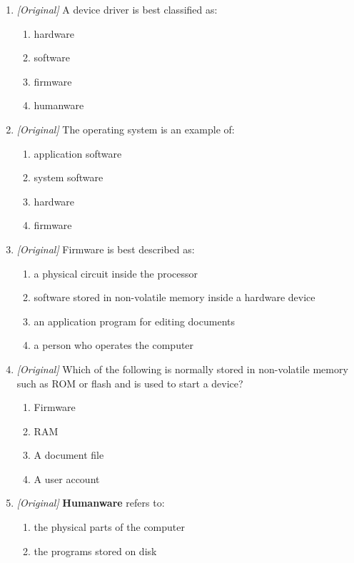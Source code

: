 \documentclass[11pt]{article}
\begin{document}
\begin{enumerate}[label=\textbf{Q\arabic*.}, leftmargin=*]
\begin{enumerate}[label=\Alph*.]
    \item MS Word
    \item CPU
  \end{enumerate}
\item \textit{[Original]} A device driver is best classified as:
  \begin{enumerate}[label=\Alph*.]
    \item hardware
    \item software
    \item firmware
    \item humanware
  \end{enumerate}
\item \textit{[Original]} The operating system is an example of:
  \begin{enumerate}[label=\Alph*.]
    \item application software
    \item system software
    \item hardware
    \item firmware
  \end{enumerate}
\item \textit{[Original]} Firmware is best described as:
  \begin{enumerate}[label=\Alph*.]
    \item a physical circuit inside the processor
    \item software stored in non-volatile memory inside a hardware device
    \item an application program for editing documents
    \item a person who operates the computer
  \end{enumerate}
\item \textit{[Original]} Which of the following is normally stored in
  non-volatile memory such as ROM or flash and is used to start a device?
  \begin{enumerate}[label=\Alph*.]
    \item Firmware
    \item RAM
    \item A document file
    \item A user account
  \end{enumerate}
\item \textit{[Original]} \textbf{Humanware} refers to:
  \begin{enumerate}[label=\Alph*.]
    \item the physical parts of the computer
    \item the programs stored on disk

\end{enumerate}
\end{enumerate}
\end{document}
